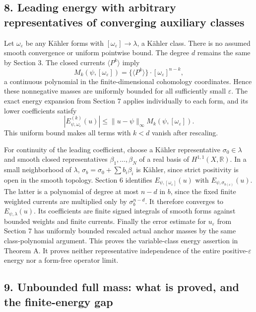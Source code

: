 \documentclass[
  10pt,
]{article}
\begin{document}
\subsection{8. Leading energy with arbitrary representatives of
converging auxiliary
classes}\label{leading-energy-with-arbitrary-representatives-of-converging-auxiliary-classes}

Let \(\omega_\varepsilon\) be any Kähler forms with
\([\omega_\varepsilon]\to\lambda\), a Kähler class. There is no assumed
smooth convergence or uniform pointwise bound. The degree \(d\) remains
the same by Section 3. The closed currents \(\langle P^k\rangle\) imply
\[
M_k(\psi,[\omega_\varepsilon])=
\{\langle P^k\rangle\}\cdot[\omega_\varepsilon]^{n-k},
\] a continuous polynomial in the finite-dimensional cohomology
coordinates. Hence these nonnegative masses are uniformly bounded for
all sufficiently small \(\varepsilon\). The exact energy expansion from
Section 7 applies individually to each form, and its lower coefficients
satisfy \[
|E^{(k)}_{\psi,\omega_\varepsilon}(u)|\leq\|u-\psi\|_\infty M_k(\psi,[\omega_\varepsilon]).
\] This uniform bound makes all terms with \(k<d\) vanish after
rescaling.

For continuity of the leading coefficient, choose a Kähler
representative \(\sigma_0\in\lambda\) and smooth closed representatives
\(\beta_1,\ldots,\beta_N\) of a real basis of \(H^{1,1}(X,\mathbb R)\).
In a small neighborhood of \(\lambda\),
\(\sigma_b=\sigma_0+\sum b_i\beta_i\) is Kähler, since strict positivity
is open in the smooth topology. Section 6 identifies
\(E_{\psi,[\omega_\varepsilon]}(u)\) with
\(E_{\psi,\sigma_{b(\varepsilon)}}(u)\). The latter is a polynomial of
degree at most \(n-d\) in \(b\), since the fixed finite weighted
currents are multiplied only by \(\sigma_b^{n-d}\). It therefore
converges to \(E_{\psi,\lambda}(u)\). Its coefficients are finite signed
integrals of smooth forms against bounded weights and finite currents.
Finally the error estimate for \(u_\varepsilon\) from Section 7 has
uniformly bounded rescaled actual anchor masses by the same
class-polynomial argument. This proves the variable-class energy
assertion in Theorem A. It proves neither representative independence of
the entire positive-\(\varepsilon\) energy nor a form-free operator
limit.

\subsection{9. Unbounded full mass: what is proved, and the
finite-energy
gap}\label{unbounded-full-mass-what-is-proved-and-the-finite-energy-gap}
\end{document}
